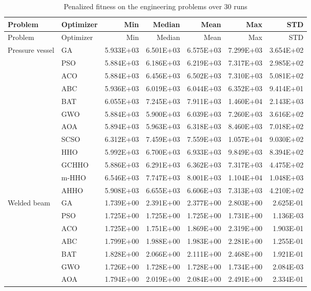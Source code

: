 \begin{longtable}{llrrrrr}
\caption{Penalized fitness on the engineering problems over 30 runs}\label{tab:eng-desc}\\
\toprule
Problem & Optimizer & Min & Median & Mean & Max & STD \\
\midrule
\endfirsthead
\toprule
Problem & Optimizer & Min & Median & Mean & Max & STD \\
\midrule
\endhead
\bottomrule
\endfoot
Pressure vessel & GA & 5.933E+03 & 6.501E+03 & 6.575E+03 & 7.299E+03 & 3.654E+02 \\
 & PSO & 5.884E+03 & 6.186E+03 & 6.219E+03 & 7.317E+03 & 2.985E+02 \\
 & ACO & 5.884E+03 & 6.456E+03 & 6.502E+03 & 7.310E+03 & 5.081E+02 \\
 & ABC & 5.936E+03 & 6.019E+03 & 6.044E+03 & 6.352E+03 & 9.414E+01 \\
 & BAT & 6.055E+03 & 7.245E+03 & 7.911E+03 & 1.460E+04 & 2.143E+03 \\
 & GWO & 5.884E+03 & 5.900E+03 & 6.039E+03 & 7.260E+03 & 3.616E+02 \\
 & AOA & 5.894E+03 & 5.963E+03 & 6.318E+03 & 8.460E+03 & 7.018E+02 \\
 & SCSO & 6.312E+03 & 7.459E+03 & 7.559E+03 & 1.057E+04 & 9.030E+02 \\
 & HHO & 5.992E+03 & 6.700E+03 & 6.933E+03 & 9.849E+03 & 8.394E+02 \\
 & GCHHO & 5.886E+03 & 6.291E+03 & 6.362E+03 & 7.317E+03 & 4.475E+02 \\
 & m-HHO & 6.546E+03 & 7.747E+03 & 8.001E+03 & 1.104E+04 & 1.048E+03 \\
 & AHHO & 5.908E+03 & 6.655E+03 & 6.606E+03 & 7.313E+03 & 4.210E+02 \\
\addlinespace
Welded beam & GA & 1.739E+00 & 2.391E+00 & 2.377E+00 & 2.803E+00 & 2.625E-01 \\
 & PSO & 1.725E+00 & 1.725E+00 & 1.725E+00 & 1.731E+00 & 1.136E-03 \\
 & ACO & 1.725E+00 & 1.751E+00 & 1.869E+00 & 2.319E+00 & 1.903E-01 \\
 & ABC & 1.799E+00 & 1.988E+00 & 1.983E+00 & 2.281E+00 & 1.255E-01 \\
 & BAT & 1.828E+00 & 2.066E+00 & 2.111E+00 & 2.468E+00 & 1.921E-01 \\
 & GWO & 1.726E+00 & 1.728E+00 & 1.728E+00 & 1.734E+00 & 2.084E-03 \\
 & AOA & 1.794E+00 & 2.019E+00 & 2.084E+00 & 2.491E+00 & 2.334E-01 \\

\end{longtable}
